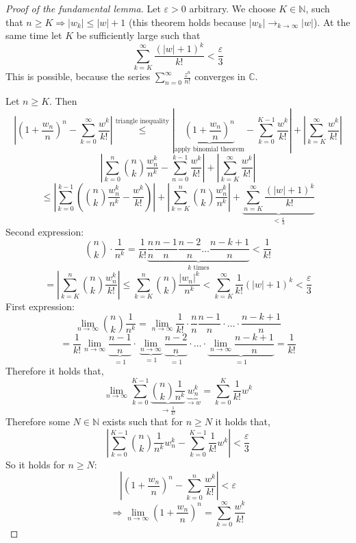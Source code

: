 \documentclass[a4paper,landscape,twocolumn]{article}
\theoremstyle{definition}
\newcommand\abs[1]{\left|#1\right|}
\begin{document}
\begin{proof}[Proof of the fundamental lemma]
  Let $\varepsilon > 0$ arbitrary. We choose $K \in \mathbb N$, such that
  $n \geq K \Rightarrow \abs{w_k} \leq \abs{w} + 1$
  (this theorem holds because $\abs{w_k} \to_{k\to\infty} \abs{w}$).
  At the same time let $K$ be sufficiently large such that
  \[ \sum_{k=K}^\infty \frac{\left(\abs{w} + 1\right)^k}{k!} < \frac{\varepsilon}{3} \]
  This is possible, because the series $\sum_{n=0}^\infty \frac{z^n}{n!}$ converges in $\mathbb C$.

  Let $n \geq K$. Then
  \[
    \abs{\left(1 + \frac{w_n}{n}\right)^{n} - \sum_{k=0}^\infty \frac{w^k}{k!}}
    \overset{\text{triangle inequality}}{\leq}
    \abs{
      \underbrace{\left(1 + \frac{w_n}{n}\right)^n}_{\text{apply binomial theorem}}
      - \sum_{k=0}^{K-1} \frac{w^k}{k!}
    } + \abs{\sum_{k=K}^{\infty} \frac{w^k}{k!}}
  \] \[
    \abs{\sum_{k=0}^n \binom nk \frac{w_n^k}{n^k} - \sum_{n=0}^{k-1} \frac{w^k}{k!}}
    + \abs{\sum_{k=K}^\infty \frac{w^k}{k!}}
  \] \[
    \leq \abs{\sum_{k=0}^{k-1} \left(\binom nk \frac{w_n^k}{n^k} - \frac{w^k}{k!}\right)}
    + \abs{\sum_{k=K}^n \binom nk \frac{w_n^k}{n^k}}
    + \underbrace{\sum_{n=K}^\infty \frac{(\abs{w} + 1)^k}{k!}}_{< \frac\varepsilon3}
  \]
  Second expression:
  \[
    \binom nk \cdot \frac{1}{n^k}
    = \frac1{k!} \underbrace{\frac nn \frac{n-1}{n} \frac{n-2}{n} \ldots \frac{n-k+1}{n}}_{k \text{ times}} < \frac1{k!}
  \] \[
    = \abs{\sum_{k=K}^n \binom nk \frac{w_n^k}{k!}}
    \leq \sum_{k=K}^n \binom nk \frac{\abs{w_n}^k}{n^k}
    < \sum_{k=K}^\infty \frac1{k!}(\abs{w} + 1)^k < \frac\varepsilon3
  \]
  First expression:
  \[
    \lim_{n\to\infty} \binom nk \frac1{n^k}
      = \lim_{n\to\infty} \frac1{k!} \cdot \frac nn \frac{n-1}{n} \cdot \ldots \cdot \frac{n-k+1}{n}
  \] \[
    = \frac1{k!} \lim_{n\to\infty} \underbrace{\frac{n-1}{n}}_{=1} \cdot \underbrace{\lim_{n\to\infty}}_{=1}
    \underbrace{\frac{n-2}{n}}_{=1} \cdot \ldots \cdot \underbrace{\lim_{n\to\infty} \frac{n-k+1}{n}}_{=1}
    = \frac1{k!}
  \]
  Therefore it holds that,
  \[ \lim_{n\to\infty} \sum_{k=0}^{K-1} \underbrace{\binom nk \frac{1}{n^k}}_{\to \frac1{k!}} \underbrace{w_n^k}_{\to w} = \sum_{k=0}^K \frac{1}{k!} w^k \]
  Therefore some $N \in \mathbb N$ exists such that for $n \geq N$ it holds that,
  \[ \abs{\sum_{k=0}^{K-1} \binom nk \frac{1}{n^k} w_n^k - \sum_{k=0}^{K-1} \frac1{k!} w^k} < \frac{\varepsilon}{3} \]
  So it holds for $n \geq N$:
  \[ \abs{\left(1 + \frac{w_n}{n}\right)^n - \sum_{k=0}^n \frac{w^k}{k!}} < \varepsilon \]
  \[ \Rightarrow \lim_{n\to\infty} \left(1 + \frac{w_n}{n}\right)^n = \sum_{k=0}^\infty \frac{w^k}{k!} \]
\end{proof}
\end{document}
